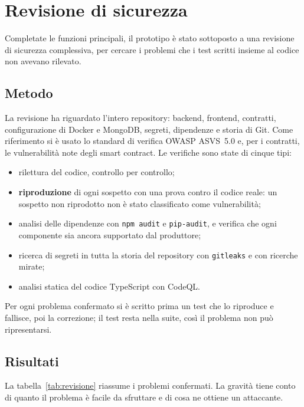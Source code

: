 \section{Revisione di sicurezza}\label{sec:revisione}

Completate le funzioni principali, il prototipo è stato sottoposto a una revisione di sicurezza complessiva, per cercare i problemi che i test scritti insieme al codice non avevano rilevato.

\subsection{Metodo}
La revisione ha riguardato l'intero repository: backend, frontend, contratti, configurazione di Docker e MongoDB, segreti, dipendenze e storia di Git. Come riferimento si è usato lo standard di verifica OWASP ASVS~5.0\cite{asvs} e, per i contratti, le vulnerabilità note degli smart contract\cite{atzei-survey}. Le verifiche sono state di cinque tipi:
\begin{itemize}
  \item rilettura del codice, controllo per controllo;
  \item \textbf{riproduzione} di ogni sospetto con una prova contro il codice reale: un sospetto non riprodotto non è stato classificato come vulnerabilità;
  \item analisi delle dipendenze con \texttt{npm audit} e \texttt{pip-audit}, e verifica che ogni componente sia ancora supportato dal produttore;
  \item ricerca di segreti in tutta la storia del repository con \texttt{gitleaks} e con ricerche mirate;
  \item analisi statica del codice TypeScript con CodeQL.
\end{itemize}
Per ogni problema confermato si è scritto prima un test che lo riproduce e fallisce, poi la correzione; il test resta nella suite, così il problema non può ripresentarsi.

\subsection{Risultati}
La tabella~\ref{tab:revisione} riassume i problemi confermati. La gravità tiene conto di quanto il problema è facile da sfruttare e di cosa ne ottiene un attaccante.

